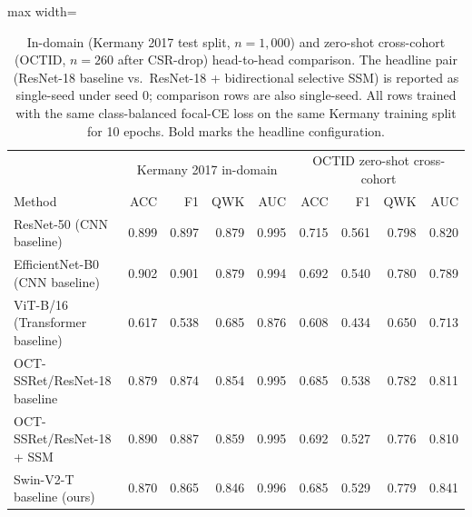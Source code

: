 \begin{table}[t]
\centering\small
\caption{In-domain (Kermany 2017 test split, $n=1{,}000$) and zero-shot cross-cohort (OCTID, $n=260$ after CSR-drop) head-to-head comparison. The headline pair (ResNet-18 baseline vs.\ ResNet-18 + bidirectional selective SSM) is reported as single-seed under seed 0; comparison rows are also single-seed. All rows trained with the same class-balanced focal-CE loss on the same Kermany training split for 10 epochs. Bold marks the headline configuration.}
\label{tab:compare}
\setlength{\tabcolsep}{4pt}
\begin{adjustbox}{max width=\textwidth}
\begin{tabular}{l rrrr | rrrr}
\toprule
 & \multicolumn{4}{c|}{Kermany 2017 in-domain} & \multicolumn{4}{c}{OCTID zero-shot cross-cohort} \\
Method & ACC & F1 & QWK & AUC & ACC & F1 & QWK & AUC \\
\midrule
ResNet-50 (CNN baseline) & 0.899 & 0.897 & 0.879 & 0.995 & 0.715 & 0.561 & 0.798 & 0.820 \\
EfficientNet-B0 (CNN baseline) & 0.902 & 0.901 & 0.879 & 0.994 & 0.692 & 0.540 & 0.780 & 0.789 \\
ViT-B/16 (Transformer baseline) & 0.617 & 0.538 & 0.685 & 0.876 & 0.608 & 0.434 & 0.650 & 0.713 \\
OCT-SSRet/ResNet-18 baseline & 0.879 & 0.874 & 0.854 & 0.995 & 0.685 & 0.538 & 0.782 & 0.811 \\
OCT-SSRet/ResNet-18 + SSM & 0.890 & 0.887 & 0.859 & 0.995 & 0.692 & 0.527 & 0.776 & 0.810 \\
Swin-V2-T baseline (ours) & 0.870 & 0.865 & 0.846 & 0.996 & 0.685 & 0.529 & 0.779 & 0.841 \\
\bottomrule
\end{tabular}
\end{adjustbox}
\end{table}